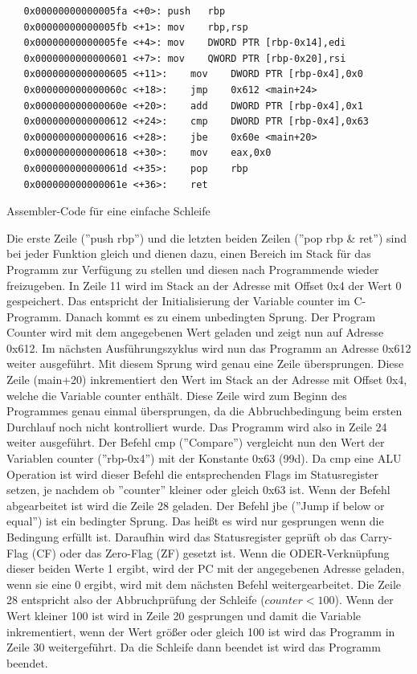 \documentclass[12pt]{article}
\begin{document}
\begin{code}[!htb]
\begin{lstlisting}
   0x00000000000005fa <+0>:	push   rbp
   0x00000000000005fb <+1>:	mov    rbp,rsp
   0x00000000000005fe <+4>:	mov    DWORD PTR [rbp-0x14],edi
   0x0000000000000601 <+7>:	mov    QWORD PTR [rbp-0x20],rsi
   0x0000000000000605 <+11>:	mov    DWORD PTR [rbp-0x4],0x0
   0x000000000000060c <+18>:	jmp    0x612 <main+24>
   0x000000000000060e <+20>:	add    DWORD PTR [rbp-0x4],0x1
   0x0000000000000612 <+24>:	cmp    DWORD PTR [rbp-0x4],0x63
   0x0000000000000616 <+28>:	jbe    0x60e <main+20>
   0x0000000000000618 <+30>:	mov    eax,0x0
   0x000000000000061d <+35>:	pop    rbp
   0x000000000000061e <+36>:	ret    
\end{lstlisting}
\caption[Assembler Code einfache Schleife]{Assembler-Code für eine einfache Schleife}
\end{code}

Die erste Zeile (''push rbp'') und die letzten beiden Zeilen (''pop rbp \& ret'') sind bei jeder Funktion gleich und dienen dazu, einen Bereich im Stack für das Programm zur Verfügung zu stellen und diesen nach Programmende wieder freizugeben. In Zeile 11 wird im Stack an der Adresse mit Offset 0x4 der Wert 0 gespeichert. Das entspricht der Initialisierung der Variable counter im C-Programm. Danach kommt es zu einem unbedingten Sprung. Der Program Counter wird mit dem angegebenen Wert geladen und zeigt nun auf Adresse 0x612. Im nächsten Ausführungszyklus wird nun das Programm an Adresse 0x612 weiter ausgeführt. Mit diesem Sprung wird genau eine Zeile übersprungen. Diese Zeile (main+20) inkrementiert den Wert im Stack an der Adresse mit Offset 0x4, welche die Variable counter enthält. Diese Zeile wird zum Beginn des Programmes genau einmal übersprungen, da die Abbruchbedingung beim ersten Durchlauf noch nicht kontrolliert wurde. Das Programm wird also in Zeile 24 weiter ausgeführt. Der Befehl cmp (''Compare'') vergleicht nun den Wert der Variablen counter (''rbp-0x4'') mit der Konstante 0x63 (99d). Da cmp eine ALU Operation ist wird dieser Befehl die entsprechenden Flags im Statusregister setzen, je nachdem ob ''counter'' kleiner oder gleich 0x63 ist. Wenn der Befehl abgearbeitet ist wird die Zeile 28 geladen. Der Befehl jbe (''Jump if below or equal'') ist ein bedingter Sprung. Das heißt es wird nur gesprungen wenn die Bedingung erfüllt ist. Daraufhin wird das Statusregister geprüft ob das Carry-Flag (CF) oder das Zero-Flag (ZF) gesetzt ist. Wenn die ODER-Verknüpfung dieser beiden Werte 1 ergibt, wird der PC mit der angegebenen Adresse geladen, wenn sie eine 0 ergibt, wird mit dem nächsten Befehl weitergearbeitet. Die Zeile 28 entspricht also der Abbruchprüfung der Schleife  ($counter < 100$). Wenn der Wert kleiner 100 ist wird in Zeile 20 gesprungen und damit die Variable inkrementiert, wenn der Wert größer oder gleich 100 ist wird das Programm in Zeile 30 weitergeführt. Da die Schleife dann beendet ist wird das Programm beendet.
\end{document}
